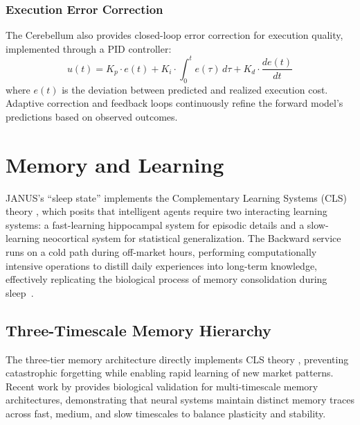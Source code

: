 \documentclass[12pt, a4paper]{article}
\begin{document}
\subsubsection{Execution Error Correction}

The Cerebellum also provides closed-loop error correction for execution quality, implemented through a PID controller:
\begin{equation}
	u(t) = K_p \cdot e(t) + K_i \cdot \int_0^t e(\tau)\,d\tau + K_d \cdot \frac{de(t)}{dt}
	\label{eq:pid}
\end{equation}
where $e(t)$ is the deviation between predicted and realized execution cost. Adaptive correction and feedback loops continuously refine the forward model's predictions based on observed outcomes.
\section{Memory and Learning}
\label{sec:memory}

JANUS's ``sleep state'' implements the Complementary Learning Systems (CLS) theory \citep{mcclelland1995complementary, kumaran2016cls}, which posits that intelligent agents require two interacting learning systems: a fast-learning hippocampal system for episodic details and a slow-learning neocortical system for statistical generalization. The Backward service runs on a cold path during off-market hours, performing computationally intensive operations to distill daily experiences into long-term knowledge, effectively replicating the biological process of memory consolidation during sleep~\citep{buzsaki2015hippocampal}.

\subsection{Three-Timescale Memory Hierarchy}
\label{sec:memory_hierarchy}

The three-tier memory architecture directly implements CLS theory \citep{mcclelland1995complementary}, preventing catastrophic forgetting while enabling rapid learning of new market patterns. Recent work by \citet{masset2025multitimescale} provides biological validation for multi-timescale memory architectures, demonstrating that neural systems maintain distinct memory traces across fast, medium, and slow timescales to balance plasticity and stability.
\end{document}
